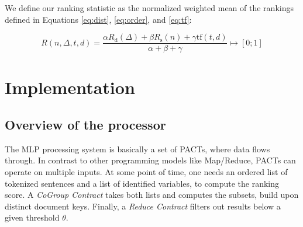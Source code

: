 \documentclass[runningheads]{llncs}
\begin{document}
We define our ranking statistic as the normalized weighted mean of the rankings defined in Equations \ref{eq:dist}, \ref{eq:order}, and \ref{eq:tf}:

\begin{equation}
	\label{eq:rating}
	R(n,\Delta,t,d)=\frac{\alpha{R}_{\mathrm d}(\Delta)+\beta{R}_{\mathrm s}(n)+\gamma\mathrm{tf}(t,d)}{\alpha+\beta+\gamma} \mapsto [0;1]
\end{equation}


\section{Implementation}

\subsection{Overview of the processor}
The MLP processing system \cite{github} is basically a set of PACTs, where data flows through. In contrast to other programming models like Map/Reduce, PACTs can operate on multiple inputs. At some point of time, one needs an ordered list of tokenized sentences and a list of identified variables, to compute the ranking score. A \emph{CoGroup Contract} takes both lists and computes the subsets, build upon distinct document keys. Finally, a \emph{Reduce Contract} filters out results below a given threshold $\theta$.
\end{document}
